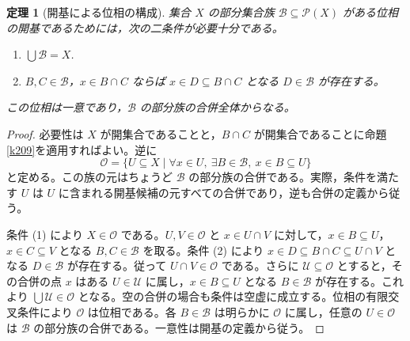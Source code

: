 \documentclass[a5paper,10pt,dvipdfmx]{jsarticle}
\theoremstyle{definition}
\theoremstyle{plain}
\newtheorem{thm}[ruledef]{定理}
\newcommand{\Pow}{\mathcal{P}}
\newcommand{\GenronRefText}[2]{#2}
\begin{document}
\begin{thm}[開基による位相の構成]\label{k210}
集合 $X$ の部分集合族 $\mathcal B\subseteq\Pow(X)$ がある位相の開基であるためには，次の二条件が必要十分である。
\begin{enumerate}
\item $\bigcup\mathcal B=X$.
\item $B,C\in\mathcal B$，$x\in B\cap C$ ならば $x\in D\subseteq B\cap C$ となる $D\in\mathcal B$ が存在する。
\end{enumerate}
この位相は一意であり，$\mathcal B$ の部分族の合併全体からなる。
\end{thm}
\begin{proof}
必要性は $X$ が開集合であることと，$B\cap C$ が開集合であることに命題\ref{k209}を適用すればよい。逆に
\[
 \mathcal O=\{U\subseteq X\mid
 \forall x\in U,\ \exists B\in\mathcal B,\ x\in B\subseteq U\}
\]
と定める。この族の元はちょうど $\mathcal B$ の部分族の合併である。実際，条件を満たす $U$ は $U$ に含まれる開基候補の元すべての合併であり，逆も合併の定義から従う。

条件 (1) により $X\in\mathcal O$ である。$U,V\in\mathcal O$ と $x\in U\cap V$ に対して，$x\in B\subseteq U$，$x\in C\subseteq V$ となる $B,C\in\mathcal B$ を取る。条件 (2) により $x\in D\subseteq B\cap C\subseteq U\cap V$ となる $D\in\mathcal B$ が存在する。従って $U\cap V\in\mathcal O$ である。さらに $\mathcal U\subseteq\mathcal O$ とすると，その合併の点 $x$ はある $U\in\mathcal U$ に属し，$x\in B\subseteq U$ となる $B\in\mathcal B$ が存在する。これより $\bigcup\mathcal U\in\mathcal O$ となる。空の合併の場合も条件は空虚に成立する。\GenronRefText{K-000147}{位相の有限交叉条件}により $\mathcal O$ は位相である。各 $B\in\mathcal B$ は明らかに $\mathcal O$ に属し，任意の $U\in\mathcal O$ は $\mathcal B$ の部分族の合併である。一意性は開基の定義から従う。
\end{proof}
\end{document}
